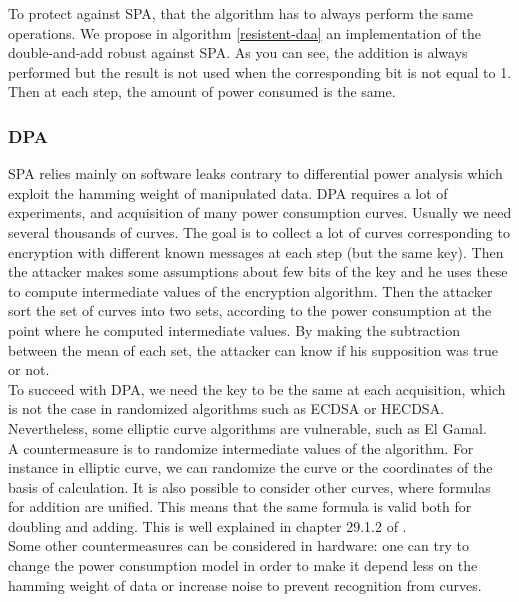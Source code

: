 \documentclass[journal]{IEEEtran}
\begin{document}
To protect against SPA, that the algorithm has to always perform the same operations. We propose in algorithm \ref{resistent-daa} an implementation of the double-and-add robust against SPA.
As you can see, the addition is always performed but the result is not used when the corresponding bit is not equal to 1. Then at each step, the amount of power consumed is the same.\\

        \subsubsection{DPA}

SPA relies mainly on software leaks contrary to differential power analysis which exploit the hamming weight of manipulated data. DPA requires a lot of experiments, and acquisition of many power consumption curves. Usually we need several thousands of curves. The goal is to collect a lot of curves corresponding to encryption with different known messages at each step (but the same key). Then the attacker makes some assumptions about few bits of the key and he uses these to compute intermediate values of the encryption algorithm. Then the attacker sort the set of curves into two sets, according to the power consumption at the point where he computed intermediate values. By making the subtraction between the mean of each set, the attacker can know if his supposition was true or not. \\

To succeed with DPA, we need the key to be the same at each acquisition, which is not the case in randomized algorithms such as ECDSA or HECDSA. Nevertheless, some elliptic curve algorithms are vulnerable, such as El Gamal.\\

A countermeasure is to randomize intermediate values of the algorithm. For instance in elliptic curve, we can randomize the curve or the coordinates of the basis of calculation.
It is also possible to consider other curves, where formulas for addition are unified. This means that the same formula is valid both for doubling and adding. This is well explained in chapter 29.1.2 of \cite{cohen2010handbook}.\\

Some other countermeasures can be considered in hardware: 
one can try to change the power consumption model in order to make it depend less on the hamming weight of data or increase noise to prevent recognition from curves.
        
\end{document}

